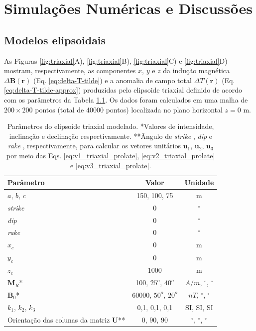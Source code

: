 \chapter{Simulações Numéricas e Discussões}

\section{Modelos elipsoidais}

As Figuras \ref{fig:triaxial}A), \ref{fig:triaxial}B), \ref{fig:triaxial}C) e \ref{fig:triaxial}D) mostram, respectivamente, as componentes $x$, $y$ e $z$ da indução magnética $\Delta \mathbf{B}(\mathbf{r})$ (Eq. \ref{eq:delta-T-tilde}) e a
anomalia de campo total $\Delta T (\mathbf{r})$ (Eq. \ref{eq:delta-T-tilde-approx}) produzidas pelo elipsoide triaxial definido de acordo com os parâmetros da Tabela \ref{tab:triaxial}.
Os dados foram calculados em uma malha de $200 \times 200$ pontos (total de 40000 pontos) localizada no plano horizontal $z = 0$ m.

\begin{table}[h]
	\begin{center}
		\begin{tabular}{|l|c|c|}
			\hline
			\textbf{Parâmetro}  & \textbf{Valor}  & \textbf{Unidade} \\
			\hline 
			$a$, $b$, $c$   & 150, 100, 75 & m\\
			\hline
			\textit{strike}   & $0$ & $^{\circ}$\\
			\hline
			\textit{dip} & $0$ & $^{\circ}$\\
			\hline
			\textit{rake} & $0$  & $^{\circ}$\\
			\hline
			$x_{c}$   & 0  & m\\
			\hline          
			$y_{c}$   & 0  & m\\
			\hline                
			$z_{c}$   & 1000 & m\\
			\hline
			$\mathbf{M}_{R}$*  & 100, $25^o$, $40^o$  & $A/m$, $^{\circ}$, $^{\circ}$\\
			\hline
			$\mathbf{B}_{0}$*    & 60000, $50^o$, $20^o$ & $nT$, $^{\circ}$, $^{\circ}$\\
			\hline
			$k_{1}$, $k_{2}$, $k_{3}$   & 0,1, 0,1, 0,1  & SI, SI, SI\\
			\hline
			Orientação das colunas da matriz $\mathbf{U}$**   & $0$, $90$, $90$  & $^{\circ}$, $^{\circ}$, $^{\circ}$\\
			\hline
		\end{tabular}
		\caption{Parâmetros do elipsoide triaxial modelado. *Valores de intensidade, inclinação e declinação respectivamente. **Ângulo de \textit{strike} , \textit{dip}  e \textit{rake} , respectivamente, para calcular os vetores unitários $\mathbf{u}_{1}$, $\mathbf{u}_{2}$, $\mathbf{u}_{3}$ por meio das Eqs. \ref{eq:v1_triaxial_prolate}, \ref{eq:v2_triaxial_prolate} e \ref{eq:v3_triaxial_prolate}.}
	\end{center}
	\label{tab:triaxial}
\end{table}

